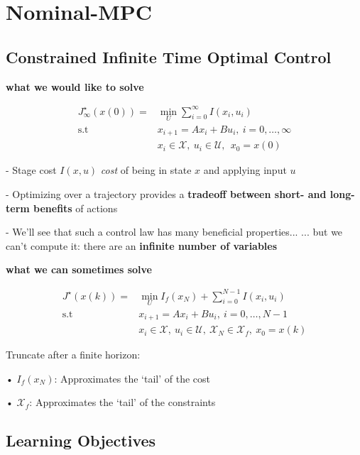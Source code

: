 \section{Nominal-MPC}

\subsection{Constrained Infinite Time Optimal Control}

\textbf{what we would like to solve}

\[ \begin{aligned}
		J_\infty^\star (x(0)) = & \min_{U} \sum_{i=0}^{\infty} I(x_i, u_i)        \\
		\text{s.t} \quad        & x_{i+1} = A x_{i} + Bu_{i},\ i = 0,\dots,\infty \\
		                        & x_{i} \in \mathcal{X},\
		u_{i} \in \mathcal{U},\
		\ x_0 = x(0)
	\end{aligned} \]

- Stage cost $I(x, u)$ \textit{cost} of being in state $x$ and applying input $u$

- Optimizing over a trajectory provides a
\textbf{tradeoff between short- and long-term benefits} of actions

- We’ll see that such a control law has many beneficial properties...
... but we can’t compute it: there are an \textbf{infinite number of variables}


\textbf{what we can sometimes solve}

\[ \begin{aligned}
		J^\star (x(k)) = & \min_{U}  I_f(x_N) + \sum_{i=0}^{N-1} I(x_{i}, u_{i})                                         \\
		\text{s.t} \quad & x_{i+1} = A x_{i} + Bu_{i},\ i = 0,\dots,N-1                                                  \\
		                 & x_{i} \in \mathcal{X},\ u_{i} \in \mathcal{U},\ \mathcal{X}_N \in \mathcal{X}_f, \ x_0 = x(k)
	\end{aligned} \]

Truncate after a finite horizon:

• $I_f(x_N)$: Approximates the ‘tail’ of the cost

• $\mathcal{X}_f$: Approximates the ‘tail’ of the constraints


\subsection{Learning Objectives}

